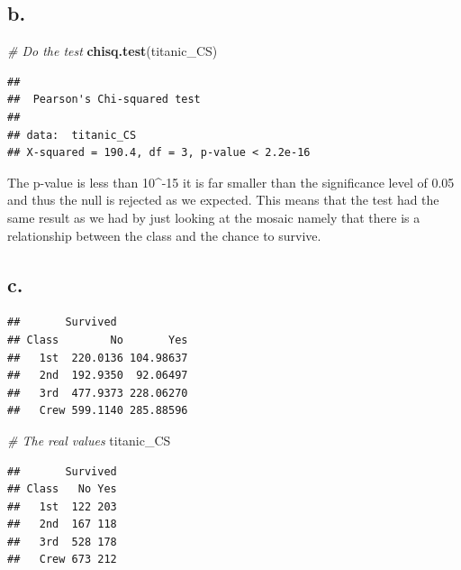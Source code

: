 \documentclass[
]{article}
\newenvironment{Shaded}{\begin{snugshade}}{\end{snugshade}}
\newcommand{\CommentTok}[1]{\textcolor[rgb]{0.56,0.35,0.01}{\textit{#1}}}
\newcommand{\FunctionTok}[1]{\textcolor[rgb]{0.13,0.29,0.53}{\textbf{#1}}}
\newcommand{\NormalTok}[1]{#1}
\newcommand{\OtherTok}[1]{\textcolor[rgb]{0.56,0.35,0.01}{#1}}
\newcommand{\SpecialCharTok}[1]{\textcolor[rgb]{0.81,0.36,0.00}{\textbf{#1}}}
\begin{document}
\subsection{b.}\label{b.-1}

\begin{Shaded}
\begin{Highlighting}[]
\CommentTok{\# Do the test}
\FunctionTok{chisq.test}\NormalTok{(titanic\_CS)}
\end{Highlighting}
\end{Shaded}

\begin{verbatim}
## 
##  Pearson's Chi-squared test
## 
## data:  titanic_CS
## X-squared = 190.4, df = 3, p-value < 2.2e-16
\end{verbatim}

The p-value is less than 10\^{}-15 it is far smaller than the
significance level of 0.05 and thus the null is rejected as we expected.
This means that the test had the same result as we had by just looking
at the mosaic namely that there is a relationship between the class and
the chance to survive.

\subsection{c.}\label{c.-1}

\begin{Shaded}
\end{Shaded}

\begin{verbatim}
##       Survived
## Class        No       Yes
##   1st  220.0136 104.98637
##   2nd  192.9350  92.06497
##   3rd  477.9373 228.06270
##   Crew 599.1140 285.88596
\end{verbatim}

\begin{Shaded}
\begin{Highlighting}[]
\CommentTok{\# The real values}
\NormalTok{titanic\_CS}
\end{Highlighting}
\end{Shaded}

\begin{verbatim}
##       Survived
## Class   No Yes
##   1st  122 203
##   2nd  167 118
##   3rd  528 178
##   Crew 673 212
\end{verbatim}
\end{document}
